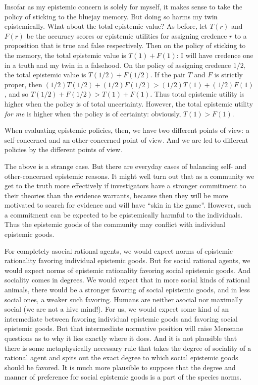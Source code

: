 Insofar as my epistemic concern is solely for myself, it makes sense to take the policy of sticking to the bluejay memory.
But doing so harms my twin epistemically. What about the total epistemic value? As before, let $T(r)$ and $F(r)$ be the accuracy 
scores or epistemic utilities for assigning credence $r$ to a proposition that is true and false respectively. Then on the policy 
of sticking to the memory, the total epistemic value is $T(1)+F(1)$: I will have credence one in a truth and my twin in a falsehood.
On the policy of assigning credence $1/2$, the total epistemic value is $T(1/2)+F(1/2)$. If the pair $T$ and $F$ is strictly proper,
then $(1/2)T(1/2)+(1/2)F(1/2) > (1/2)T(1)+(1/2)F(1)$, and so $T(1/2)+F(1/2)>T(1)+F(1)$. Thus total epistemic utility is higher
when the policy is of total uncertainty. However, the total epistemic utility \textit{for me} is higher when the policy is of
certainty: obviously, $T(1)>F(1)$. 

When evaluating epistemic policies, then, we have two different points of view: a self-concerned and an other-concerned 
point of view. And we are led to different policies by the different points of view.

The above is a strange case. But there are everyday cases of balancing self- and other-concerned epistemic reasons. It might well turn out that as a community we 
get to the truth more effectively if investigators have a stronger commitment to their theories than the evidence warrants,
because then they will be more motivated to search for evidence and will have ``skin in the game''. However, such a commitment
can be expected to be epistemically harmful to the individuals. Thus the epistemic goods of the community may conflict with 
individual epistemic goods. 

For completely asocial rational agents, we would expect norms of epistemic rationality favoring individual epistemic goods. But for 
social rational agents, we would expect norms of epistemic rationality favoring social epistemic goods. And sociality comes in degrees.
We would expect that in more social kinds of rational animals, there would be a stronger favoring of social epistemic goods, and in
less social ones, a weaker such favoring. Humans are neither asocial nor maximally social (we are not a hive mind!). For us, we would expect
some kind of an intermediate between favoring individual epistemic goods and favoring social epistemic goods. But that intermediate 
normative position will raise Mersenne questions as to why it lies exactly where it does. And it is not plausible that there is some 
metaphysically necessary rule that takes the degree of sociality of a rational agent and spits out the exact degree to which social epistemic 
goods should be favored. It is much more plausible to suppose that the degree and manner of preference for social epistemic goods is 
a part of the species norms. 

